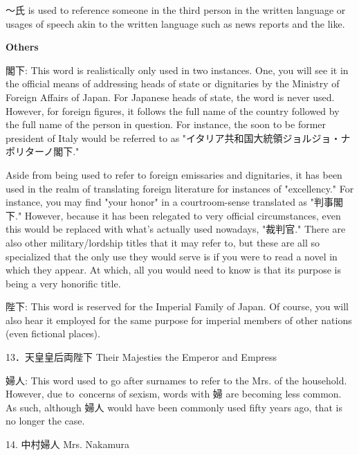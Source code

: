 \par{ ～氏 is used to reference someone in the third person in the written language or usages of speech akin to the written language such as news reports and the like. }

\begin{center}
\textbf{Others }
\end{center}

\par{閣下: This word is realistically only used in two instances. One, you will see it in the official means of addressing heads of state or dignitaries by the Ministry of Foreign Affairs of Japan. For Japanese heads of state, the word is never used. However, for foreign figures, it follows the full name of the country followed by the full name of the person in question. For instance, the soon to be former president of Italy would be referred to as "イタリア共和国大統領ジョルジョ・ナポリターノ閣下." }

\par{Aside from being used to refer to foreign emissaries and dignitaries, it has been used in the realm of translating foreign literature for instances of "excellency." For instance, you may find "your honor" in a courtroom-sense translated as "判事閣下." However, because it has been relegated to very official circumstances, even this would be replaced with what's actually used nowadays, "裁判官." There are also other military\slash lordship titles that it may refer to, but these are all so specialized that the only use they would serve is if you were to read a novel in which they appear. At which, all you would need to know is that its purpose is being a very honorific title. }

\par{陛下: This word is reserved for the Imperial Family of Japan. Of course, you will also hear it employed for the same purpose for imperial members of other nations (even fictional places). }

\par{13．天皇皇后両陛下 \hfill\break
Their Majesties the Emperor and Empress }

\par{婦人: This word used to go after surnames to refer to the Mrs. of the household. However, due to concerns of sexism, words with 婦 are becoming less common. As such, although 婦人 would have been commonly used fifty years ago, that is no longer the case. }

\par{14. 中村婦人 \hfill\break
Mrs. Nakamura }

